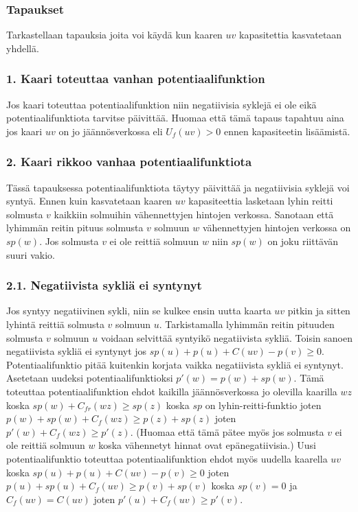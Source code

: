 \documentclass[a4paper, 11pt]{article}
\begin{document}
\subsubsection*{Tapaukset}
Tarkastellaan tapauksia joita voi käydä kun kaaren $uv$ kapasitettia kasvatetaan 
yhdellä.
\subsubsection*{1. Kaari toteuttaa vanhan potentiaalifunktion}
Jos kaari toteuttaa potentiaalifunktion niin negatiivisia syklejä ei ole
eikä potentiaalifunktiota tarvitse päivittää. Huomaa että tämä tapaus tapahtuu
aina jos kaari $uv$ on jo jäännösverkossa eli $U_f(uv) > 0$ ennen kapasiteetin
lisäämistä.
\subsubsection*{2. Kaari rikkoo vanhaa potentiaalifunktiota}
Tässä tapauksessa potentiaalifunktiota
täytyy päivittää ja negatiivisia syklejä voi syntyä. 
Ennen kuin kasvatetaan kaaren $uv$ kapasiteettia
lasketaan lyhin reitti solmusta $v$ kaikkiin solmuihin vähennettyjen hintojen verkossa.
Sanotaan että lyhimmän reitin pituus solmusta $v$ solmuun $w$ vähennettyjen hintojen verkossa
on $sp(w)$. Jos solmusta $v$ ei ole reittiä solmuun $w$ niin $sp(w)$ on joku riittävän
suuri vakio.
\subsubsection*{2.1. Negatiivista sykliä ei syntynyt}
Jos syntyy negatiivinen sykli, niin se kulkee ensin uutta kaarta $uv$ pitkin ja sitten
lyhintä reittiä solmusta $v$ solmuun $u$. Tarkistamalla lyhimmän reitin pituuden solmusta
$v$ solmuun $u$ voidaan selvittää syntyikö negatiivista sykliä. Toisin sanoen negatiivista
sykliä ei syntynyt jos $sp(u) + p(u) + C(uv) - p(v) \ge 0$. Potentiaalifunktio
pitää kuitenkin korjata vaikka negatiivista sykliä ei syntynyt. Asetetaan uudeksi
potentiaalifunktioksi $p'(w) = p(w) + sp(w)$. Tämä toteuttaa
potentiaalifunktion ehdot kaikilla jäännösverkossa jo olevilla kaarilla $wz$ koska 
$sp(w) + C_{fr}(wz) \ge sp(z)$ koska $sp$ on lyhin-reitti-funktio
joten $p(w) + sp(w) + C_f(wz) \ge p(z) + sp(z)$ joten $p'(w) + C_f(wz) \ge p'(z)$.
(Huomaa että tämä pätee myös jos solmusta $v$ ei ole reittiä solmuun $w$ koska vähennetyt
hinnat ovat epänegatiivisia.) Uusi potentiaalifunktio toteuttaa potentiaalifunktion
ehdot myös uudella kaarella $uv$ koska $sp(u) + p(u) + C(uv) - p(v) \ge 0$ joten
$p(u) + sp(u) + C_f(uv) \ge p(v) + sp(v)$ koska $sp(v) = 0$ ja $C_f(uv) = C(uv)$
joten $p'(u) + C_f(uv) \ge p'(v)$.
\end{document}
